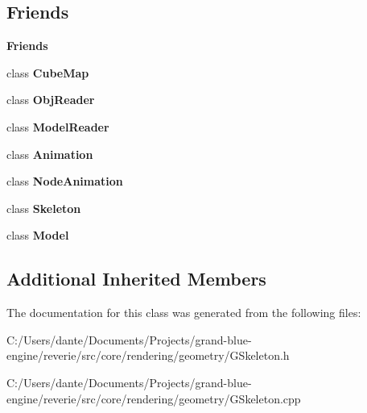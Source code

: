 \subsection*{Friends}
\begin{Indent}\textbf{ Friends}\par
\begin{DoxyCompactItemize}
\item 
\mbox{\label{classrev_1_1_skeleton_joint_a83d06bada150194666fdc02c043d1080}} 
class {\bfseries Cube\+Map}
\item 
\mbox{\label{classrev_1_1_skeleton_joint_aa89c0df06f5945a12b1d029612d199cd}} 
class {\bfseries Obj\+Reader}
\item 
\mbox{\label{classrev_1_1_skeleton_joint_ac3e0a085a76d6fcad904e95ebbe2c6a5}} 
class {\bfseries Model\+Reader}
\item 
\mbox{\label{classrev_1_1_skeleton_joint_af47625f50036c466946f960db7320bcf}} 
class {\bfseries Animation}
\item 
\mbox{\label{classrev_1_1_skeleton_joint_a395c52c1b342efdb79f36b2d4b2f1565}} 
class {\bfseries Node\+Animation}
\item 
\mbox{\label{classrev_1_1_skeleton_joint_a6a11291b70c2cbded85d321ce539c62f}} 
class {\bfseries Skeleton}
\item 
\mbox{\label{classrev_1_1_skeleton_joint_a2bf2a0e9b454c55aa5dcb5aa4698697b}} 
class {\bfseries Model}
\end{DoxyCompactItemize}
\end{Indent}
\subsection*{Additional Inherited Members}


The documentation for this class was generated from the following files\+:\begin{DoxyCompactItemize}
\item 
C\+:/\+Users/dante/\+Documents/\+Projects/grand-\/blue-\/engine/reverie/src/core/rendering/geometry/G\+Skeleton.\+h\item 
C\+:/\+Users/dante/\+Documents/\+Projects/grand-\/blue-\/engine/reverie/src/core/rendering/geometry/G\+Skeleton.\+cpp\end{DoxyCompactItemize}
